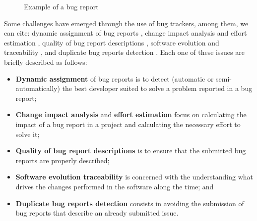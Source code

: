 \begin{figure}[htp]
\centering
  \caption[Example of a bug report]{Example of a bug report}
  \label{fg:tracbug}
\end{figure}

Some challenges have emerged through the use of bug trackers,
among them, we can cite: dynamic assignment of bug reports \citep{Anvik2006a},
change impact analysis and effort estimation \citep{Song2006}, quality of bug
report descriptions \citep{Ko2006}, software evolution and traceability
\citep{Sandusky2004}, and duplicate bug reports detection \citep{Hiew2006}.
Each one of these issues are briefly described as follows:

\begin{itemize}
  \item \textbf{Dynamic assignment} of bug reports is to detect (automatic or
semi-automatically) the best developer suited to solve a problem reported
in a bug report;
  \item \textbf{Change impact analysis} and \textbf{effort estimation}
focus on calculating the impact of a bug report in a project and calculating the
necessary effort to solve it;
  \item \textbf{Quality of bug report descriptions} is to ensure that the
  submitted bug reports are properly described;
  \item \textbf{Software evolution traceability} is concerned with
the understanding what drives the changes performed in the software along the
time; and
  \item \textbf{Duplicate bug reports detection} consists in avoiding the
  submission of bug reports that describe an already submitted issue.
\end{itemize}

